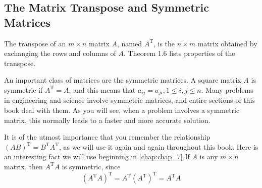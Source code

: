 \documentclass[../main.tex]{subfiles}
\begin{document}
\subsection*{The Matrix Transpose and Symmetric Matrices}
The transpose of an $m \times n$ matrix $A$, named $A^{\mathrm{T}}$, is the $n \times m$ matrix obtained by exchanging the rows and columns of $A$. Theorem 1.6 lists properties of the transpose.

An important class of matrices are the symmetric matrices. A square matrix $A$ is symmetric if $A^{\mathrm{T}}=A$, and this means that $a_{i j}=a_{j i}, 1 \leq i, j \leq n .$ Many problems in engineering and science involve symmetric matrices, and entire sections of this book deal with them. As you will see, when a problem involves a symmetric matrix, this normally leads to a faster and more accurate solution.

It is of the utmost importance that you remember the relationship $(A B)^{\mathrm{T}}=B^{\mathrm{T}} A^{\mathrm{T}}$, as we will use it again and again throughout this book. Here is an interesting fact we will use beginning in \autoref{chap:chap_7} If $A$ is any $m \times n$ matrix, then $A^{\mathrm{T}} A$ is symmetric, since
$$
\left(A^{\mathrm{T}} A\right)^{\mathrm{T}}=A^{\mathrm{T}}\left(A^{\mathrm{T}}\right)^{\mathrm{T}}=A^{\mathrm{T}} A
$$
\end{document}

